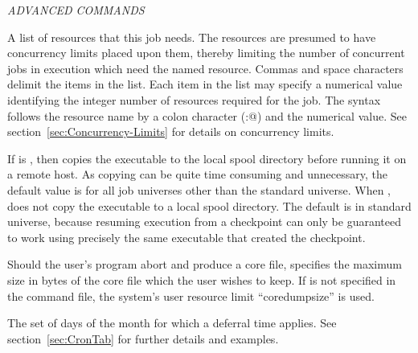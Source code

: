 \emph{ADVANCED COMMANDS}
\begin{description} 

\item[concurrency\_limits = $<$string-list$>$]
A list of resources that this job needs.
The resources are presumed to have concurrency limits placed upon them,
thereby limiting the number of concurrent jobs in execution which
need the named resource.
Commas and space characters delimit the items in the list.
Each item in the list may specify a numerical value identifying the integer
number of resources required for the job.
The syntax follows the resource name by a colon character (\verb@:@)
and the numerical value.
See section~\ref{sec:Concurrency-Limits} for details on concurrency limits.


\item[copy\_to\_spool = $<$True \Bar\ False$>$]
If  is ,
then  copies the executable to the local spool 
directory before running it on a remote host. 
As copying can be quite time consuming and unnecessary,
the default value is  for all job universes
other than the standard universe. 
When ,  does not copy the executable
to a local spool directory.
The default is  in standard universe, because
resuming execution from a checkpoint can only be guaranteed to work using
precisely the same executable that created the checkpoint.


\item[coresize = $<$size$>$] Should the user's program abort and produce
a core file,  specifies the maximum size in bytes of the
core file which the user wishes to keep. If  is not
specified in the command file, the system's user resource limit
\mbox{``coredumpsize''} is used.

\item[cron\_day\_of\_month = $<$Cron-evaluated Day$>$]
The set of days of the month for which a deferral time applies.
See section~\ref{sec:CronTab} for further details and examples.


\end{description}
